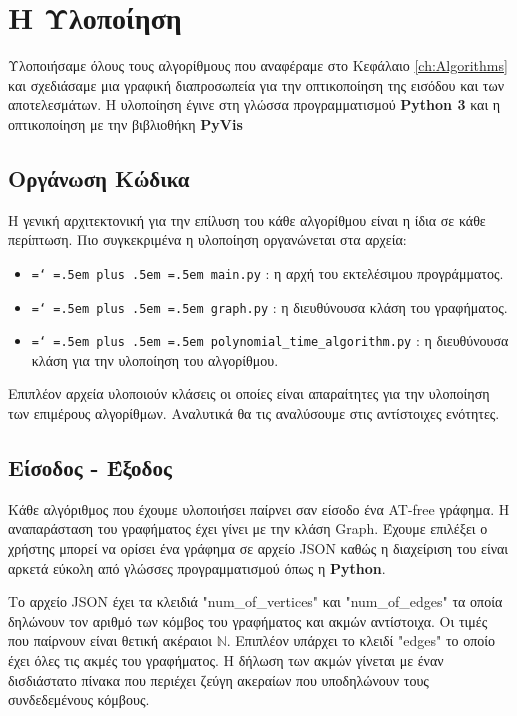 \chapter{Η Υλοποίηση}
\label{ch:Implementation}

\newcommand{\myTTT}[1]{\texttt{\hyphenchar \font=`\- \spaceskip=.5em plus .5em \xspaceskip=.5em #1}}

Υλοποιήσαμε όλους τους αλγορίθμους που αναφέραμε στο Κεφάλαιο \ref{ch:Algorithms} και σχεδιάσαμε μια γραφική διαπροσωπεία για την οπτικοποίηση της εισόδου και των
αποτελεσμάτων. Η υλοποίηση έγινε στη γλώσσα προγραμματισμού \textbf{Python 3} και η οπτικοποίηση με την βιβλιοθήκη \textbf{PyVis}\cite{pyvis-docs}

\section{Οργάνωση Κώδικα}

Η γενική αρχιτεκτονική για την επίλυση του κάθε αλγορίθμου είναι η ίδια σε κάθε περίπτωση. Πιο συγκεκριμένα η υλοποίηση οργανώνεται στα αρχεία: 
\begin{itemize}
	\item \myTTT{main.py} : η αρχή του εκτελέσιμου προγράμματος.
	
	\item \myTTT{graph.py} : η διευθύνουσα κλάση του γραφήματος.
	
	\item \myTTT{polynomial\_time\_algorithm.py} : η διευθύνουσα κλάση για την υλοποίηση του αλγορίθμου.
	 
\end{itemize} 

Επιπλέον αρχεία υλοποιούν κλάσεις οι οποίες είναι απαραίτητες για την υλοποίηση των επιμέρους αλγορίθμων. Αναλυτικά θα τις αναλύσουμε στις αντίστοιχες ενότητες. 

\section{Είσοδος - Έξοδος}

Κάθε αλγόριθμος που έχουμε υλοποιήσει παίρνει σαν είσοδο ένα AT-free γράφημα. Η αναπαράσταση του γραφήματος έχει γίνει με την κλάση Graph. Έχουμε επιλέξει ο χρήστης μπορεί να ορίσει ένα γράφημα σε αρχείο JSON καθώς η διαχείριση του είναι αρκετά εύκολη από γλώσσες προγραμματισμού όπως η \textbf{Python}. 

Το αρχείο JSON έχει τα κλειδιά "num\_of\_vertices" και "num\_of\_edges" τα οποία δηλώνουν τον αριθμό των κόμβος του γραφήματος και ακμών αντίστοιχα. Οι τιμές που παίρνουν είναι θετική ακέραιοι $\mathbb{N}$. Επιπλέον υπάρχει το κλειδί "edges" το οποίο έχει όλες τις ακμές του γραφήματος. Η δήλωση των ακμών γίνεται με έναν δισδιάστατο πίνακα που περιέχει ζεύγη ακεραίων που υποδηλώνουν τους συνδεδεμένους κόμβους.


